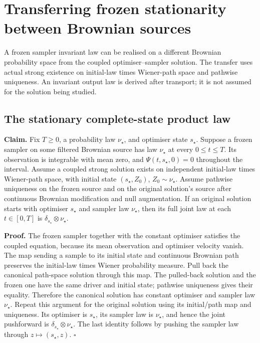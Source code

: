 \documentclass[11pt,a4paper]{report}
\begin{document}
\section{\texorpdfstring{Transferring frozen stationarity between Brownian sources}{Transferring frozen stationarity between Brownian sources}}


A frozen sampler invariant law can be realised on a different Brownian probability space from the coupled optimiser–sampler solution. The transfer uses actual strong existence on initial-law times Wiener-path space and pathwise uniqueness. An invariant output law is derived after transport; it is not assumed for the solution being studied.

\subsection{\texorpdfstring{The stationary complete-state product law}{The stationary complete-state product law}}


\textbf{Claim.} Fix \(T\ge0\), a probability law \(\nu_\star\), and optimiser state \(s_\star\). Suppose a frozen sampler on some filtered Brownian source has law \(\nu_\star\) at every \(0\le t\le T\). Its observation is integrable with mean zero, and \(\Psi(t,s_\star,0)=0\) throughout the interval. Assume a coupled strong solution exists on independent initial-law times Wiener-path space, with initial state \((s_\star,Z_0)\), \(Z_0\sim\nu_\star\). Assume pathwise uniqueness on the frozen source and on the original solution's source after continuous Brownian modification and null augmentation. If an original solution starts with optimiser \(s_\star\) and sampler law \(\nu_\star\), then its full joint law at each \(t\in[0,T]\) is \(\delta_{s_\star}\otimes\nu_\star\).



\textbf{Proof.} The frozen sampler together with the constant optimiser satisfies the coupled equation, because its mean observation and optimiser velocity vanish. The map sending a sample to its initial state and continuous Brownian path preserves the initial-law times Wiener probability measure. Pull back the canonical path-space solution through this map. The pulled-back solution and the frozen one have the same driver and initial state; pathwise uniqueness gives their equality. Therefore the canonical solution has constant optimiser and sampler law \(\nu_\star\). Repeat this argument for the original solution using its initial/\allowbreak{}path map and uniqueness. Its optimiser is \(s_\star\), its sampler law is \(\nu_\star\), and hence the joint pushforward is \(\delta_{s_\star}\otimes\nu_\star\). The last identity follows by pushing the sampler law through \(z\mapsto(s_\star,z)\). \(\square\)
\end{document}

